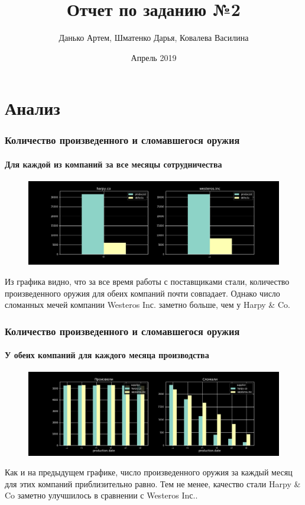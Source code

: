 \documentclass[10pt,pdf,hyperref={unicode}]{beamer}
\title{\huge Отчет по заданию №2}
\author{Данько Артем, Шматенко Дарья, Ковалева Василина}
\date{Апрель 2019}
\begin{document}
\frame[plain]{\titlepage}

\section{Анализ}

\begin{frame}
\frametitle{Количество произведенного и сломавшегося оружия}
\framesubtitle{Для каждой из компаний за все месяцы сотрудничества}
\begin{figure}[t]
    \centering
    \includegraphics[width=1.0\textwidth]{6.png}
\end{figure}
Из графика видно, что за все время работы с поставщиками стали, количество произведенного оружия для обеих компаний почти совпадает. Однако число сломанных мечей компании Westeros Inс. заметно больше, чем у Harpy \& Co.
\end{frame}

\begin{frame}
\frametitle{Количество произведенного и сломавшегося оружия}
\framesubtitle{У обеих компаний для каждого месяца производства}
\begin{figure}[t]
    \centering
    \includegraphics[width=1.0\textwidth]{3.png}
\end{figure}
Как и на предыдущем графике, число произведенного оружия за каждый месяц для этих компаний приблизительно равно. Тем не менее, качество стали Harpy \& Co заметно улучшилось в сравнении с Westeros Inс..
\end{frame}
\end{document}
